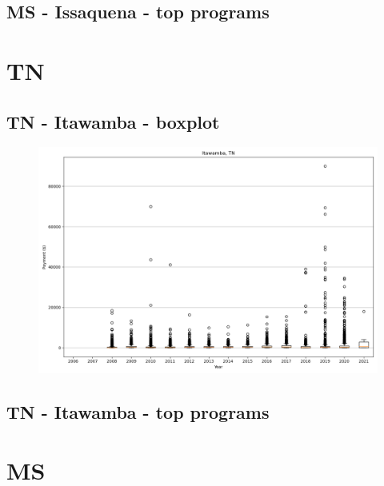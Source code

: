 \subsection*{MS - Issaquena - top programs}

\newpage
\section*{TN}
\subsection*{TN - Itawamba - boxplot}
\begin{figure}[h]
\centering
\includegraphics[width=7in]{../output/boxplots/counties/Itawamba-TN_boxplot.png}
\end{figure}


\subsection*{TN - Itawamba - top programs}

\newpage
\section*{MS}
